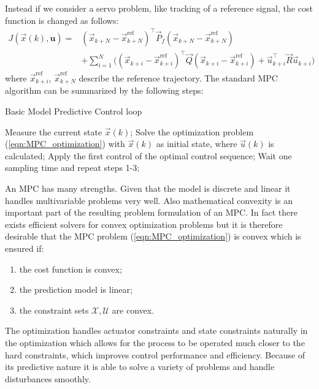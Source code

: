 Instead if we consider a servo problem, like tracking of a reference signal, the cost function is changed as follows:
\begin{equation}
\label{eqn:MPC_cost_function_servo}
\begin{aligned}
J(\vec{x}(k), \textbf{u})=& (\vec{x}_{k+N}-\vec{x}^\text{ref}_{k+N})^\intercal\vec{P}_f(\vec{x}_{k+N}-\vec{x}^\text{ref}_{k+N})\\
&+\sum_{i=1}^{N}\Big((\vec{x}_{k+i}-\vec{x}^\text{ref}_{k+i})^\intercal\vec{Q}(\vec{x}_{k+i}-\vec{x}^\text{ref}_{k+i})+\vec{u}_{k+i}^\intercal\vec{R}\vec{u}_{k+i}\Big)
\end{aligned}
\end{equation}
where $\vec{x}^\text{ref}_{k+i}$, $\vec{x}^\text{ref}_{k+N}$ describe the reference trajectory. 
The standard MPC algorithm can be summarized by the following steps:
\begin{algorithm}%
	\caption{Basic Model Predictive Control loop}
	\small
	\begin{algorithmic}[1]
		\State Measure the current state $\vec{x}(k)$;
		\State Solve the optimization problem (\ref{eqn:MPC_optimization}) with $\vec{x}(k)$ as initial state, where $\vec{u}(k)$ is calculated;
		\State Apply the first control of the optimal control sequence;
		\State Wait one sampling time and repeat steps 1-3;
	\end{algorithmic}
	\label{alg:MPCloop}
\end{algorithm}

An MPC has many strengths. Given that the model is discrete and linear it handles multivariable problems very well. Also mathematical convexity is an important part of the resulting problem formulation of an MPC. In fact there exists efficient solvers for convex optimization problems but it is therefore desirable that the MPC problem (\ref{eqn:MPC_optimization}) is convex which is ensured if:
\begin{enumerate}
\item the cost function is convex;
\item the prediction model is linear;
\item the constraint sets $\mathcal{X}, \mathcal{U}$ are convex.	
\end{enumerate}	

The optimization handles actuator constraints and state constraints naturally in the optimization which allows for
the process to be operated much closer to the hard constraints, which improves control performance and efficiency. Because of its predictive nature it is able to solve a variety of problems and handle disturbances smoothly.


